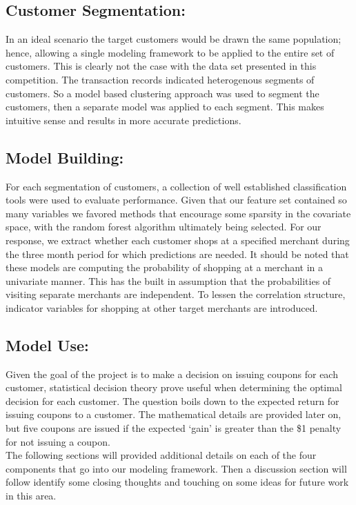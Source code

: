 \documentclass[12pt]{article} %
\begin{document}
\subsection*{Customer Segmentation:} 
In an ideal scenario the target customers would be drawn the same population; hence, allowing a single modeling framework to be applied to the entire set of customers.  This is clearly not the case with the data set presented in this competition.  The transaction records indicated  heterogenous segments of customers.  So a model based clustering approach was used to segment the customers, then a separate model was applied to each segment.  This makes intuitive sense and results in more accurate predictions. 

\subsection*{Model Building:} 
For each segmentation of customers, a collection of well established classification tools were used to evaluate performance.  Given that our feature set contained so many variables we favored methods that encourage some sparsity in the covariate space, with the random forest algorithm ultimately being selected.  For our response, we extract whether each customer shops at a specified merchant during the three month period for which predictions are needed.  It should be noted that these models are computing the probability of shopping at a merchant in a univariate manner.  This has the built in assumption that the probabilities of visiting separate merchants are independent.  To lessen the correlation structure, indicator variables for shopping at other target merchants are introduced.

\subsection*{Model Use:} 
Given the goal of the project is to make a decision on issuing coupons for each customer, statistical decision theory prove useful when determining the optimal decision for each customer.  The question boils down to the expected return for issuing coupons to a customer.  The mathematical details are provided later on, but five coupons are issued if the expected `gain' is greater than the \$1 penalty for not issuing a coupon.\\

The following sections will provided additional details on each of the four components that go into our modeling framework.  Then a discussion section will follow identify some closing thoughts and touching on some ideas for future work in this area. 
\end{document}
